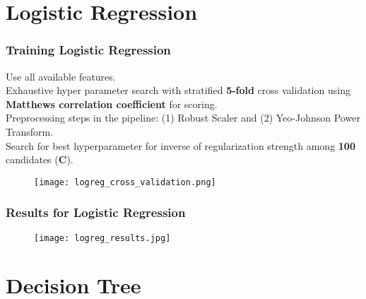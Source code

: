 \documentclass[11pt]{beamer}
\begin{document}
\section{Logistic Regression}

\begin{frame}[fragile]
  \frametitle{\normalsize{\textbf{
    Training Logistic Regression
  }}} 

  \scriptsize{  

    \textbullet \: Use all available features. \\[0.25cm]

    \textbullet \: Exhaustive hyper parameter search with stratified \textbf{5-fold} 
    cross validation using \textbf{Matthews correlation coefficient} for scoring. \\[0.25cm]

    \textbullet \: Preprocessing steps in the pipeline: (1) Robust Scaler and 
    (2) Yeo-Johnson Power Transform. \\[0.25cm]

    \textbullet \: Search for best hyperparameter for inverse of regularization 
    strength among \textbf{100} candidates (\textbf{C}).

    \begin{figure}[h!]
      \centering
      \texttt{[image: logreg\_cross\_validation.png]}
    \end{figure}
  }
\end{frame}

\begin{frame}[fragile]
  \frametitle{\normalsize{\textbf{
    Results for Logistic Regression
  }}} 

  \scriptsize{  

    \begin{figure}[h!]
      \centering
      \texttt{[image: logreg\_results.jpg]}
    \end{figure}  
  }
\end{frame}

\section{Decision Tree}
\end{document}
